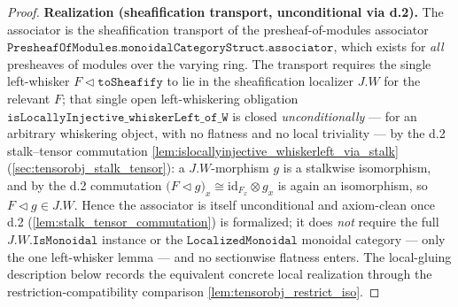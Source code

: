 \begin{proof}
  \leanok
  \textbf{Realization (sheafification transport, unconditional via d.2).} The
  associator is the sheafification transport of the presheaf-of-modules associator
  \(\mathtt{PresheafOfModules.monoidalCategoryStruct.associator}\), which exists for
  \emph{all} presheaves of modules over the varying ring. The transport requires the
  single left-whisker \(F \triangleleft \mathtt{toSheafify}\) to lie in the
  sheafification localizer \(J.W\) for the relevant \(F\); that single open
  left-whiskering obligation \(\mathtt{isLocallyInjective\_whiskerLeft\_of\_W}\) is
  closed \emph{unconditionally} --- for an arbitrary whiskering object, with no
  flatness and no local triviality --- by the d.2 stalk--tensor commutation
  \cref{lem:islocallyinjective_whiskerleft_via_stalk} (\cref{sec:tensorobj_stalk_tensor}):
  a \(J.W\)-morphism \(g\) is a stalkwise isomorphism, and by the d.2 commutation
  \(\bigl(F \triangleleft g\bigr)_x \cong \mathrm{id}_{F_x} \otimes g_x\) is again an
  isomorphism, so \(F \triangleleft g \in J.W\). Hence the associator is itself
  unconditional and axiom-clean once d.2 (\cref{lem:stalk_tensor_commutation}) is
  formalized; it does \emph{not} require the full \(J.W.\mathtt{IsMonoidal}\) instance
  or the \(\mathtt{LocalizedMonoidal}\) monoidal category --- only the one left-whisker
  lemma --- and no sectionwise flatness enters. The local-gluing description below
  records the equivalent concrete local realization through the
  restriction-compatibility comparison \cref{lem:tensorobj_restrict_iso}.


\end{proof}
